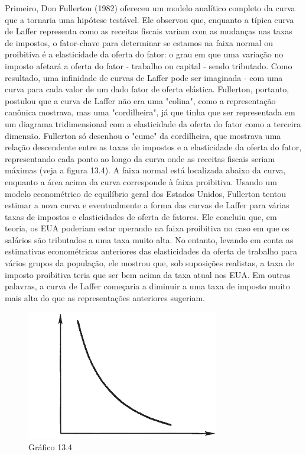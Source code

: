 \documentclass[12pt]{article}
\begin{document}
Primeiro, Don Fullerton (1982) ofereceu um modelo analítico completo da curva que a tornaria uma hipótese testável. Ele observou que, enquanto a típica curva de Laffer representa como as receitas fiscais variam com as mudanças nas taxas de impostos, o fator-chave para determinar se estamos na faixa normal ou proibitiva é a elasticidade da oferta do fator: o grau em que uma variação no imposto afetará a oferta do fator - trabalho ou capital - sendo tributado. Como resultado, uma infinidade de curvas de Laffer pode ser imaginada - com uma curva para cada valor de um dado fator de oferta elástica. Fullerton, portanto, postulou que a curva de Laffer não era uma "colina", como a representação canônica mostrava, mas uma "cordilheira", já que tinha que ser representada em um diagrama tridimensional com a elasticidade da oferta do fator como a terceira dimensão. Fullerton só desenhou o "cume" da cordilheira, que mostrava uma relação descendente entre as taxas de impostos e a elasticidade da oferta do fator, representando cada ponto ao longo da curva onde as receitas fiscais seriam máximas (veja a figura 13.4). A faixa normal está localizada abaixo da curva, enquanto a área acima da curva corresponde à faixa proibitiva. Usando um modelo econométrico de equilíbrio geral dos Estados Unidos, Fullerton tentou estimar a nova curva e eventualmente a forma das curvas de Laffer para várias taxas de impostos e elasticidades de oferta de fatores. Ele concluiu que, em teoria, os EUA poderiam estar operando na faixa proibitiva no caso em que os salários são tributados a uma taxa muito alta. No entanto, levando em conta as estimativas econométricas anteriores das elasticidades da oferta de trabalho para vários grupos da população, ele mostrou que, sob suposições realistas, a taxa de imposto proibitiva teria que ser bem acima da taxa atual nos EUA. Em outras palavras, a curva de Laffer começaria a diminuir a uma taxa de imposto muito mais alta do que as representações anteriores sugeriam.

\begin{figure}[H]
    \centering
    \caption{Gráfico 13.4}
    \includegraphics[width=0.75\textwidth]{4º Período/História do Pensamento Econômico/Tradução HPE/Tradução Tópico 9.3/figura 4.png}
    \end{figure}
\end{document}
